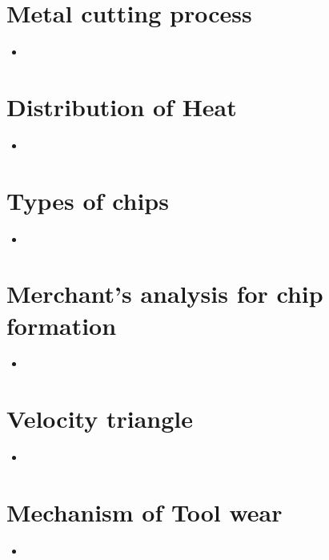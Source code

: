 \documentclass[8pt]{report}
\begin{document}
\section{Metal cutting process}
	\begin{itemize}
		\item
	\end{itemize}\hrulefill
\section{Distribution of Heat}
	\begin{itemize}
		\item
	\end{itemize}\hrulefill
\section{Types of chips}
	\begin{itemize}
		\item
	\end{itemize}\hrulefill
\section{Merchant's analysis for chip formation}
	\begin{itemize}
		\item
	\end{itemize}\hrulefill
\section{Velocity triangle}
	\begin{itemize}
		\item
	\end{itemize}\hrulefill
\section{Mechanism of Tool wear}
	\begin{itemize}
		\item
	\end{itemize}\hrulefill
\end{document}
